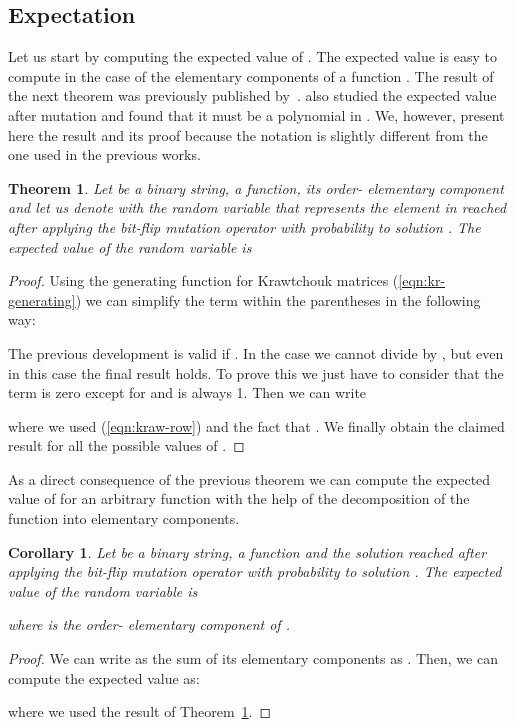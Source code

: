 \documentclass{article}
\newtheorem{theorem}{Theorem}
\newtheorem{corollary}{Corollary}
\begin{document}
\subsection{Expectation}
\label{subsec:expectation}

Let us start by computing the expected value of . The expected value is easy to compute in the case of the elementary components of a function . The result of the next theorem was previously published by~\cite{Chicano2011gecco}. \cite{Sutton2011gecco} also studied the expected value after mutation and found that it must be a polynomial in . We, however, present here the result and its proof because the notation is slightly different from the one used in the previous works.

\begin{theorem}
\label{thm:mut-exp-elementary}
Let  be a binary string,  a function,  its order- elementary component and let us denote with  the random variable that represents the element in  reached after applying the bit-flip mutation operator with probability  to solution . The expected value of the random variable  is

\end{theorem}
\begin{proof}


Using the generating function for Krawtchouk matrices (\ref{eqn:kr-generating}) we can simplify the term within the parentheses in the following way:



The previous development is valid if . In the case  we cannot divide by , but even in this case the final result holds. To prove this we just have to consider that the term  is zero except for  and  is always 1. Then we can write

where we used (\ref{eqn:kraw-row}) and the fact that . We finally obtain the claimed result for all the possible values of .
\end{proof}

As a direct consequence of the previous theorem we can compute the expected value of  for an arbitrary function with the help of the decomposition of the function into elementary components.

\begin{corollary}
Let  be a binary string,  a function and  the solution reached after applying the bit-flip mutation operator with probability  to solution . The expected value of the random variable  is

where  is the order- elementary component of .
\end{corollary}
\begin{proof}
We can write  as the sum of its elementary components as . Then, we can compute the expected value as:

where we used the result of Theorem~\ref{thm:mut-exp-elementary}.
\end{proof}
\end{document}
